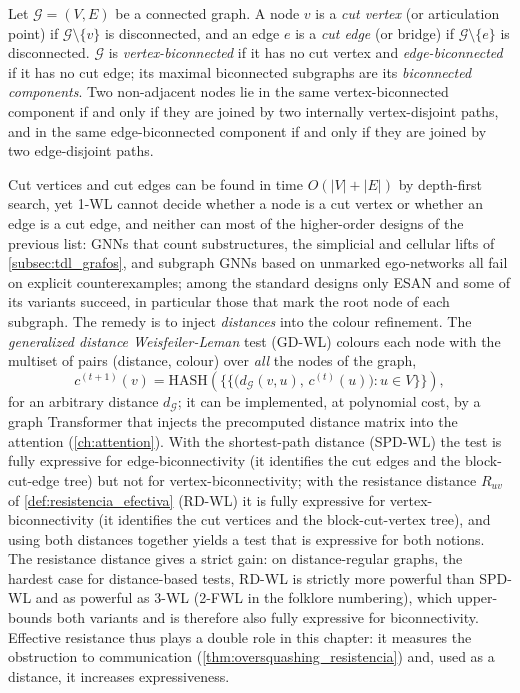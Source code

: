\begin{definition}\label{def:biconectividad}
	Let $\mathcal{G} = (V, E)$ be a connected graph. A node $v$ is a \textit{cut vertex} (or articulation point) if $\mathcal{G} \setminus \{v\}$ is disconnected, and an edge $e$ is a \textit{cut edge} (or bridge) if $\mathcal{G} \setminus \{e\}$ is disconnected. $\mathcal{G}$ is \textit{vertex-biconnected} if it has no cut vertex and \textit{edge-biconnected} if it has no cut edge; its maximal biconnected subgraphs are its \textit{biconnected components}. Two non-adjacent nodes lie in the same vertex-biconnected component if and only if they are joined by two internally vertex-disjoint paths, and in the same edge-biconnected component if and only if they are joined by two edge-disjoint paths.
\end{definition}

Cut vertices and cut edges can be found in time $O(|V| + |E|)$ by depth-first search, yet 1-WL cannot decide whether a node is a cut vertex or whether an edge is a cut edge, and neither can most of the higher-order designs of the previous list: \glspl{GNN} that count substructures, the simplicial and cellular lifts of \autoref{subsec:tdl_grafos}, and subgraph \glspl{GNN} based on unmarked ego-networks all fail on explicit counterexamples; among the standard designs only ESAN and some of its variants succeed, in particular those that mark the root node of each subgraph. The remedy is to inject \textit{distances} into the colour refinement. The \textit{generalized distance Weisfeiler-Leman} test (GD-WL) colours each node with the multiset of pairs (distance, colour) over \textit{all} the nodes of the graph,
\begin{equation}\label{eq:gd_wl}
	c^{(t+1)}(v) = \mathrm{HASH}\!\left(\bigl\{\!\!\bigl\{ \bigl(d_{\mathcal{G}}(v,u),\, c^{(t)}(u)\bigr) : u \in V \bigr\}\!\!\bigr\}\right),
\end{equation}
for an arbitrary distance $d_{\mathcal{G}}$; it can be implemented, at polynomial cost, by a graph \gls{Transformer} that injects the precomputed distance matrix into the attention (\autoref{ch:attention}). With the shortest-path distance (SPD-WL) the test is fully expressive for edge-biconnectivity (it identifies the cut edges and the block-cut-edge tree) but not for vertex-biconnectivity; with the resistance distance $R_{uv}$ of \autoref{def:resistencia_efectiva} (RD-WL) it is fully expressive for vertex-biconnectivity (it identifies the cut vertices and the block-cut-vertex tree), and using both distances together yields a test that is expressive for both notions. The resistance distance gives a strict gain: on distance-regular graphs, the hardest case for distance-based tests, RD-WL is strictly more powerful than SPD-WL and as powerful as 3-WL (2-FWL in the folklore numbering), which upper-bounds both variants and is therefore also fully expressive for biconnectivity. Effective resistance thus plays a double role in this chapter: it measures the obstruction to communication (\autoref{thm:oversquashing_resistencia}) and, used as a distance, it increases expressiveness.

